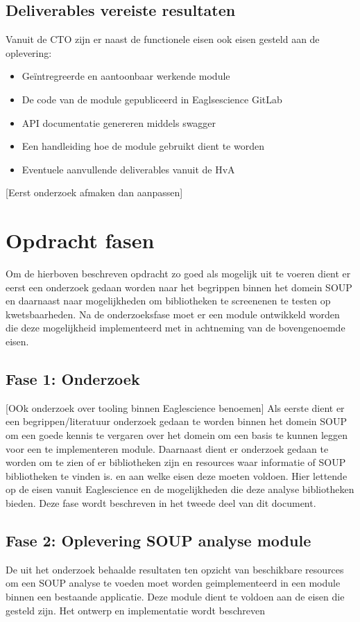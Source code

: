 \subsection{Deliverables vereiste resultaten}
Vanuit de CTO zijn er naast de functionele eisen ook eisen gesteld aan de oplevering:
\begin{itemize}
\item Geïntregreerde en aantoonbaar werkende module
\item De code van de module gepubliceerd in Eaglsescience GitLab
\item API documentatie genereren middels swagger
\item Een handleiding hoe de module gebruikt dient te worden
\item Eventuele aanvullende deliverables vanuit de HvA
\end{itemize}



[Eerst onderzoek afmaken dan aanpassen]
\section{Opdracht fasen}
Om de hierboven beschreven opdracht zo goed als mogelijk uit te voeren dient er eerst een onderzoek gedaan worden naar het begrippen binnen het domein SOUP en daarnaast naar mogelijkheden om bibliotheken te screenenen te testen op kwetsbaarheden. Na de onderzoeksfase  moet er een module ontwikkeld worden die deze mogelijkheid implementeerd met in achtneming van de bovengenoemde eisen.

\subsection{Fase 1: Onderzoek}
[OOk onderzoek over tooling binnen Eaglescience benoemen]
Als eerste dient er een begrippen/literatuur onderzoek gedaan te worden binnen het domein SOUP om een goede kennis te vergaren over het domein om een basis te kunnen leggen voor een te implementeren module. Daarnaast dient er onderzoek gedaan te worden om te zien of er bibliotheken zijn en resources waar informatie of SOUP bibliotheken te vinden is. en aan welke eisen deze moeten voldoen. Hier lettende op de eisen vanuit Eaglescience en de mogelijkheden die deze analyse bibliotheken bieden. Deze fase wordt beschreven in het tweede deel van dit document.

\subsection{Fase 2: Oplevering SOUP analyse module}
De uit het onderzoek behaalde resultaten ten opzicht van beschikbare resources om een SOUP analyse te voeden moet worden geimplementeerd in een module binnen een bestaande applicatie. Deze module dient te voldoen aan de eisen die gesteld zijn. Het ontwerp en implementatie wordt beschreven

